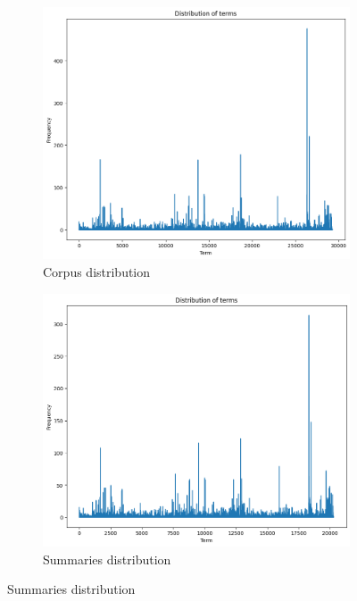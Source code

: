 \begin{figure}[h]
    \centering
    \begin{subfigure}{0.45\textwidth}
        \centering
        \includegraphics[width=\linewidth]{images/dist_D.png}
        \caption{Corpus distribution}
        \label{fig:Corpus}
    \end{subfigure}
    \begin{subfigure}{0.45\textwidth}
        \centering
        \includegraphics[width=\linewidth]{images/dist_S.png}
        \caption{Summaries distribution}
        \label{fig:Summaries}
    \end{subfigure}
    \label{fig:distributions}
\end{figure}

